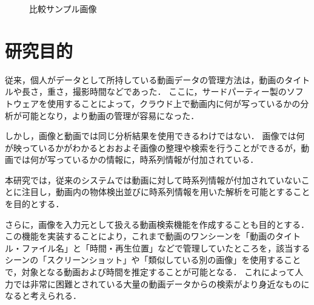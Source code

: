 \documentclass[a4j,12pt,dvipdfmx]{jreport}
\begin{document}
\vspace{2zh}
\begin{figure}[htbp]
  \centering
  \caption{\label{fig:hikaku} 比較サンプル画像}
\end{figure}

\clearpage
\section{研究目的}
従来，個人がデータとして所持している動画データの管理方法は，動画のタイトルや長さ，重さ，撮影時間などであった．
ここに，サードパーティー製のソフトウェアを使用することによって，クラウド上で動画内に何が写っているかの分析が可能となり，より動画の管理が容易になった．

しかし，画像と動画では同じ分析結果を使用できるわけではない．
画像では何が映っているかがわかるとおおよそ画像の整理や検索を行うことができるが，動画では何が写っているかの情報に，時系列情報が付加されている．

本研究では，従来のシステムでは動画に対して時系列情報が付加されていないことに注目し，動画内の物体検出並びに時系列情報を用いた解析を可能とすることを目的とする．

さらに，画像を入力元として扱える動画検索機能を作成することも目的とする．
この機能を実装することにより，これまで動画のワンシーンを「動画のタイトル・ファイル名」と「時間・再生位置」などで管理していたところを，該当するシーンの「スクリーンショット」や「類似している別の画像」を使用することで，対象となる動画および時間を推定することが可能となる．
これによって人力では非常に困難とされている大量の動画データからの検索がより身近なものになると考えられる．

\clearpage
\end{document}
